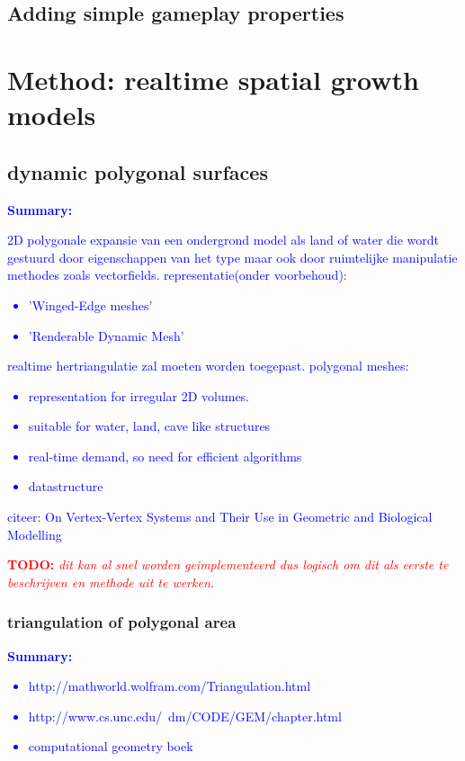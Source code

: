 \documentclass{article}
\newcommand{\todo}[1]{\textcolor{red}{\textbf{TODO: }\it{#1}}}
\newcommand{\inhoud}[1]{\textcolor{blue}{\textbf{Summary: }\it{#1}}}
\begin{document}
\subsection{Adding simple gameplay properties}


\section{Method: realtime spatial growth models}

\subsection{dynamic polygonal surfaces}
\inhoud{2D polygonale expansie van een ondergrond model als land of water die wordt gestuurd door eigenschappen van het type maar ook door ruimtelijke manipulatie methodes zoals vectorfields. representatie(onder voorbehoud): 
\begin{itemize}
\item 'Winged-Edge meshes' 
\item 'Renderable Dynamic Mesh'
\end{itemize}
realtime hertriangulatie zal moeten worden toegepast. 
polygonal meshes: 
\begin{itemize}
\item representation for irregular 2D volumes.  
\item suitable for water, land, cave like structures  
\item real-time demand, so need for efficient algorithms
\item datastructure
\end{itemize}
citeer: On Vertex-Vertex Systems and Their Use in
Geometric and Biological Modelling
}

\todo{dit kan al snel worden geimplementeerd dus logisch om dit als eerste te beschrijven en methode uit te werken.}

\cite{vertexsystems}





\subsubsection{triangulation of polygonal area}
\cite{compgeom}

\inhoud{\begin{itemize}
\item http://mathworld.wolfram.com/Triangulation.html
\item http://www.cs.unc.edu/~dm/CODE/GEM/chapter.html
\item computational geometry boek
\end{itemize}
}
\end{document}
